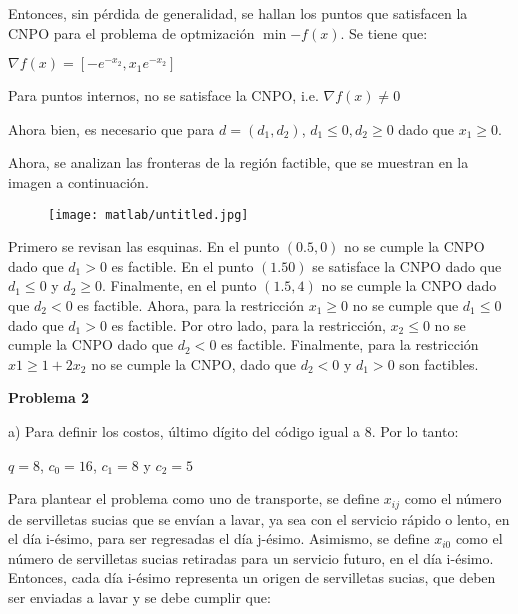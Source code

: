 \documentclass[10pt]{article}
\begin{document}
Entonces, sin p\'erdida de generalidad, se hallan los puntos que satisfacen la CNPO para el problema de optmizaci\'on $\min{-f(x)}$. Se tiene que: 

\begin{center}
$\nabla f(x) = [-e^{-x_2}, x_1e^{-x_2}]$
\end{center} 

Para puntos internos, no se satisface la CNPO, i.e. $\nabla f(x) \neq 0$

Ahora bien, es necesario que para $d = (d_1, d_2)$, $d_1 \leq 0, d_2 \geq 0$ dado que $x_1 \geq 0$.

Ahora, se analizan las fronteras de la regi\'on factible, que se muestran en la imagen a continuaci\'on. 


\begin{center}
\begin{figure}[ht!]
\texttt{[image: matlab/untitled.jpg]}
\end{figure}
\end{center}

Primero se revisan las esquinas. En el punto $(0.5, 0)$ no se cumple la CNPO dado que $d_1 > 0$ es factible. En el punto $(1.5 0)$ se satisface la CNPO dado que $d_1 \leq 0$ y $d_2 \geq 0$. Finalmente, en el punto $(1.5, 4)$ no se cumple la CNPO dado que $d_2 < 0$ es factible. Ahora, para la restricci\'on $x_1 \geq 0$ no se cumple que $d_1 \leq 0$ dado que $d_1 > 0$ es factible. Por otro lado, para la restricci\'on, $x_2 \leq 0$ no se cumple la CNPO dado que $d_2 < 0$ es factible. Finalmente, para la restricci\'on $x1 \geq 1 + 2x_2$ no se cumple la CNPO, dado que $d_2 < 0$ y $d_1 > 0$ son factibles.

\bigskip

{\bf \Large{Problema 2}}
\medskip

a) Para definir los costos, \'ultimo d\'igito del c\'odigo igual a 8. Por lo tanto:

\begin{center}
$q=8$, $c_0 = 16$, $c_1 = 8$ y $c_2 = 5$
\end{center}

Para plantear el problema como uno de transporte, se define $x_{ij}$ como el n\'umero de servilletas sucias que se env\'ian a lavar, ya sea con el servicio r\'apido o lento, en el d\'ia i-\'esimo, para ser regresadas el d\'ia j-\'esimo. Asimismo, se define $x_{i0}$ como el n\'umero de servilletas sucias retiradas para un servicio futuro, en el d\'ia i-\'esimo. Entonces, cada d\'ia i-\'esimo representa un origen de servilletas sucias, que deben ser enviadas a lavar y se debe cumplir que: 
\end{document}
